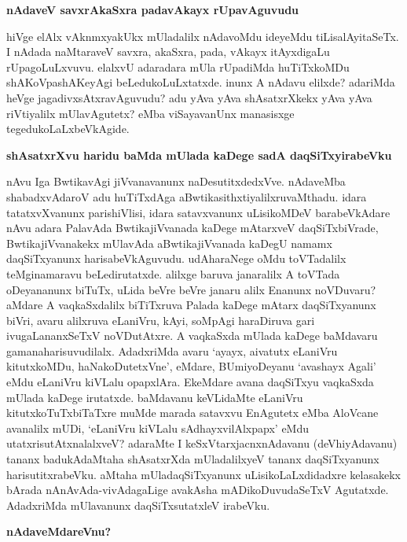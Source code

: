 \noindent
{\bf\large{nAdaveV savxrAkaSxra padavAkayx rUpavAguvudu}}\label{page141}

hiVge elAlx vAknmxyakUkx mUladalilx nAdavoMdu ideyeMdu tiLisalAyitaSeTx. I nAdada naMtaraveV savxra, akaSxra, pada, vAkayx itAyxdigaLu rUpagoLuLxvuvu. elalxvU adaradara mUla rUpadiMda huTiTxkoMDu shAKoVpashAKeyAgi beLedukoLuLxtatxde. inunx A nAdavu elilxde? adariMda heVge jagadivxsAtxravAguvudu? adu yAva yAva shAsatxrXkekx yAva yAva riVtiyalilx mUlavAgutetx? eMba viSayavanUnx manasisxge tegedukoLaLxbeVkAgide.

\noindent
{\bf\large{shAsatxrXvu haridu baMda mUlada kaDege sadA daqSiTxyirabeVku}}\label{page142}

nAvu Iga BwtikavAgi jiVvanavanunx naDesutitxdedxVve. nAdaveMba shabadxvAdaroV adu huTiTxdAga aBwtikasithxtiyalilxruvaMthadu. idara tatatxvXvanunx parishiVlisi, idara satavxvanunx uLisikoMDeV barabeVkAdare nAvu adara PalavAda BwtikajiVvanada kaDege mAtarxveV daqSiTxbiVrade, BwtikajiVvanakekx mUlavAda aBwtikajiVvanada kaDegU namamx daqSiTxyanunx harisabeVkAguvudu. udAharaNege oMdu toVTadalilx teMginamaravu beLedirutatxde. alilxge baruva janaralilx A toVTada oDeyananunx biTuTx, uLida beVre beVre janaru alilx Enanunx noVDuvaru? aMdare A vaqkaSxdalilx biTiTxruva Palada kaDege mAtarx daqSiTxyanunx biVri, avaru alilxruva eLaniVru, kAyi, soMpAgi haraDiruva gari ivugaLananxSeTxV noVDutAtxre. A vaqkaSxda mUlada kaDege baMdavaru gamanaharisuvudilalx. AdadxriMda avaru `ayayx, aivatutx eLaniVru kitutxkoMDu, haNakoDutetxVne', eMdare, BUmiyoDeyanu `avashayx Agali' eMdu eLaniVru kiVLalu opapxlAra. EkeMdare avana daqSiTxyu vaqkaSxda mUlada kaDege irutatxde. baMdavanu keVLidaMte eLaniVru kitutxkoTuTxbiTaTxre muMde marada satavxvu EnAgutetx eMba AloVcane avanalilx mUDi, `eLaniVru kiVLalu sAdhayxvilAlxpapx' eMdu utatxrisutAtxnalalxveV? adaraMte I keSxVtarxjacnxnAdavanu (deVhiyAdavanu) tananx badukAdaMtaha shAsatxrXda mUladalilxyeV tananx daqSiTxyanunx harisutitxrabeVku. aMtaha mUladaqSiTxyanunx uLisikoLaLxdidadxre kelasakekx bArada nAnAvAda-vivAdagaLige avakAsha mADikoDuvudaSeTxV Agutatxde. AdadxriMda mUlavanunx daqSiTxsutatxleV irabeVku.

\noindent
{\bf\large{nAdaveMdareVnu?}}\label{page142}

